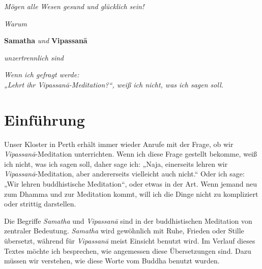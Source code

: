 \documentclass[12pt,openany]{book}
\begin{document}
\vfill

\begin{center}
\textit{Mögen alle Wesen gesund und glücklich sein!}

\end{center}
\vfill

 \newpage

\begin{center}\end{center}
\begin{center}

\vfill

{\huge \textit{Warum} 

\medskip

\textbf{Samatha} \textit{und} \textbf{Vipassanā} 

\bigskip

\textit{unzertrennlich sind}}

\vfill


\vfill
\end{center}

 \newpage

\begin{center}\end{center}
\begin{center}

\vfill

\textit{\large Wenn ich gefragt werde: \\„Lehrt ihr Vipassanā-Meditation?“, weiß ich nicht, was ich sagen soll.}

\vfill

\end{center}

\newpage
\mainmatter
\chapter*{Einführung}

Unser Kloster in Perth erhält immer wieder Anrufe mit der Frage, ob wir \textit{Vipas\-sanā}-Meditation unterrichten. Wenn ich diese Frage gestellt bekomme, weiß ich nicht, was ich sagen soll, daher sage ich: „Naja, einerseits lehren wir \textit{Vipas\-sanā}-Meditation, aber andererseits vielleicht auch nicht.“ Oder ich sage: „Wir lehren buddhistische Meditation“, oder etwas in der Art. Wenn jemand neu zum Dhamma und zur Meditation kommt, will ich die Dinge nicht zu kompliziert oder strittig darstellen.

Die Begriffe \textit{Samatha} und \textit{Vipas\-sanā} sind in der buddhistischen Meditation von zentraler Bedeutung. \textit{Samatha} wird gewöhnlich mit Ruhe, Frieden oder Stille übersetzt, während für \textit{Vipas\-sanā} meist Einsicht benutzt wird. Im Verlauf dieses Textes möchte ich besprechen, wie angemessen diese Übersetzungen sind. Dazu müssen wir verstehen, wie diese Worte vom Buddha benutzt wurden.
\end{document}
